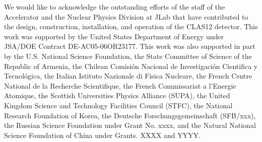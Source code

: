 \documentclass[final,3p,twocolumn]{elsarticle}
\begin{document}
We would like to acknowledge the outstanding efforts of the staff of the Accelerator and the Nuclear Physics Division at
JLab that have contributed to the design, construction, installation, and operation of the CLAS12 detector. This work was
supported by the United States Department of Energy under JSA/DOE Contract DE-AC05-06OR23177. This work was also
supported in part by the U.S. National Science Foundation, the State Committee of Science of the Republic of Armenia, the
Chilean Comisi\'on Nacional de Investigaci\'on Cientifica y Tecnol\'ogica, the Italian Istituto Nazionale di Fisica Nucleare,
the French Centre National de la Recherche Scientifique, the French Commissariat a l'Energie Atomique, the Scottish
Universities Physics Alliance (SUPA), the United Kingdom Science and Technology Facilities Council (STFC), the National
Research Foundation of Korea, the Deutsche Forschungsgemeinschaft (SFB/xxx), the Russian Science Foundation under
Grant No. xxxx, and the Natural National Science Foundation of China under Grants. XXXX and YYYY. 

\end{document}
